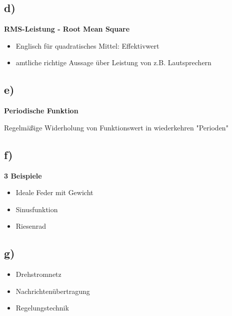 \documentclass[../../document.tex]{subfiles}
\begin{document}
\subsection*{d)}

\textbf{RMS-Leistung - Root Mean Square}

\begin{itemize}
    \item Englisch für quadratisches Mittel: Effektivwert
    \item amtliche richtige Aussage über Leistung von z.B. Lautsprechern
\end{itemize}

\subsection*{e)}

\textbf{Periodische Funktion}

Regelmäßige Widerholung von Funktionswert in wiederkehren "Perioden"

\subsection*{f)}

\textbf{3 Beispiele}

\begin{itemize}
    \item Ideale Feder mit Gewicht
    \item Sinusfunktion
    \item Riesenrad
\end{itemize}

\subsection*{g)}

\begin{itemize}
    \item Drehstromnetz
    \item Nachrichtenübertragung
    \item Regelungstechnik
\end{itemize}
\end{document}
